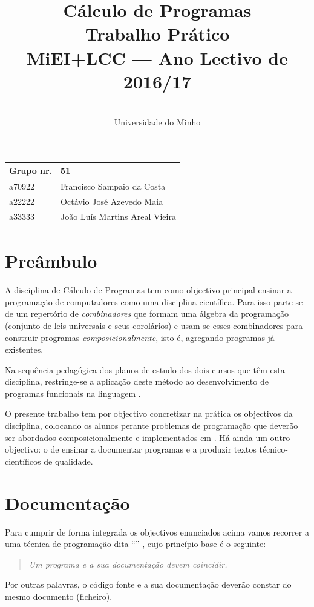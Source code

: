 \documentclass[a4paper]{article}
\title{
       	    Cálculo de Programas
\\
       	Trabalho Prático
\\
       	MiEI+LCC --- Ano Lectivo de 2016/17
}
\author{
       	\dium
\\
       	Universidade do Minho
}
\date\mydate
\begin{document}
\maketitle

\begin{center}\large
\begin{tabular}{ll}
\textbf{Grupo} nr. & 51 
\\\hline
a70922 & Francisco Sampaio da Costa
\\
a22222 & Octávio José Azevedo Maia
\\
a33333 & João Luís Martins Areal Vieira
\end{tabular}
\end{center}

\tableofcontents

\newpage

\section{Preâmbulo}

A disciplina de Cálculo de Programas tem como objectivo principal ensinar
a progra\-mação de computadores como uma disciplina científica. Para isso
parte-se de um repertório de \emph{combinadores} que formam uma álgebra da
programação (conjunto de leis universais e seus corolários) e usam-se esses
combinadores para construir programas \emph{composicionalmente}, isto é,
agregando programas já existentes.

Na sequência pedagógica dos planos de estudo dos dois cursos que têm esta
disciplina, restringe-se a aplicação deste método ao desenvolvimento de programas
funcionais na linguagem \Haskell.

O presente trabalho tem por objectivo concretizar na prática os objectivos
da disciplina, colocando os alunos perante problemas de programação que
deverão ser abordados composicionalmente e implementados em \Haskell.
Há ainda um outro objectivo: o de ensinar a documentar programas e
a produzir textos técnico-científicos de qualidade.

\section{Documentação}
Para cumprir de forma integrada os objectivos enunciados acima vamos recorrer
a uma técnica de programa\-ção dita ``'' \cite{Kn92}, cujo
princípio base é o seguinte:
\begin{quote}\em
Um programa e a sua documentação devem coincidir.
\end{quote}
Por outras palavras, o código fonte e a sua documentação deverão constar
do mesmo documento (ficheiro).
\end{document}
